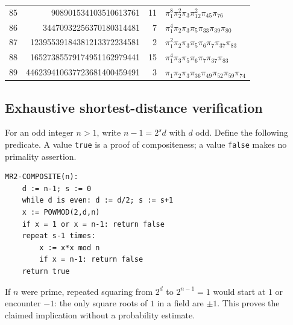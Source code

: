 \documentclass[11pt,a4paper]{article}
\theoremstyle{definition}
\theoremstyle{remark}
\numberwithin{equation}{section}
\begin{document}
{\begin{longtable}{r r r l}
85 & 908901534103510613761 & 11 & $\pi_{1}^{8}\pi_{2}^{2}\pi_{3}\pi_{12}^{2}\pi_{45}\pi_{76}$ \\
86 & 34470932256370180314481 & 7 & $\pi_{1}^{4}\pi_{2}\pi_{3}\pi_{5}\pi_{33}\pi_{39}\pi_{80}$ \\
87 & 12395539184381213372234581 & 2 & $\pi_{1}^{2}\pi_{2}\pi_{3}\pi_{5}\pi_{6}\pi_{7}\pi_{37}\pi_{83}$ \\
88 & 16527385579174951162979441 & 15 & $\pi_{1}^{4}\pi_{3}\pi_{5}\pi_{6}\pi_{7}\pi_{37}\pi_{83}$ \\
89 & 446239410637723681400459491 & 3 & $\pi_{1}\pi_{2}\pi_{3}\pi_{36}\pi_{49}\pi_{52}\pi_{59}\pi_{74}$ \\
\end{longtable}
}

\subsection{Exhaustive shortest-distance verification}

For an odd integer $n>1$, write $n-1=2^s d$ with $d$ odd. Define the
following predicate. A value \texttt{true} is a proof of compositeness;
a value \texttt{false} makes no primality assertion.
\begin{verbatim}
MR2-COMPOSITE(n):
    d := n-1; s := 0
    while d is even: d := d/2; s := s+1
    x := POWMOD(2,d,n)
    if x = 1 or x = n-1: return false
    repeat s-1 times:
        x := x*x mod n
        if x = n-1: return false
    return true
\end{verbatim}
If $n$ were prime, repeated squaring from $2^d$ to $2^{n-1}=1$ would
start at $1$ or encounter $-1$: the only square roots of $1$ in a field
are $\pm1$. This proves the claimed implication without a probability
estimate.
\end{document}
